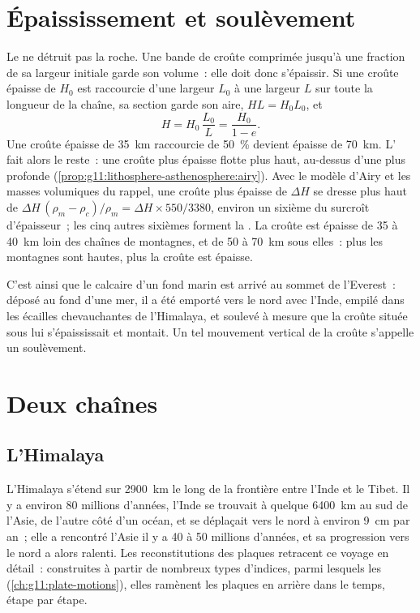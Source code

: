 \section{Épaississement et soulèvement}

Le  ne détruit pas la roche. Une bande de croûte comprimée
jusqu'à une fraction de sa largeur initiale garde son volume~: elle doit
donc s'épaissir. Si une croûte épaisse de $H_0$ est raccourcie d'une
largeur $L_0$ à une largeur $L$ sur toute la longueur de la chaîne, sa
section garde son aire, $H L = H_0 L_0$, et
\[
  H = H_0\,\frac{L_0}{L} = \frac{H_0}{1 - e}.
\]
Une croûte épaisse de \qty{35}{km} raccourcie de \qty{50}{\percent} devient
épaisse de \qty{70}{km}. L' fait alors le reste~: une croûte plus
épaisse flotte plus haut, au-dessus d'une  plus profonde
(\cref{prop:g11:lithosphere-asthenosphere:airy}). Avec le modèle d'Airy et
les masses volumiques du rappel, une croûte plus épaisse de $\Delta H$ se
dresse plus haut de $\Delta H\,(\rho_m - \rho_c)/\rho_m = \Delta H
\times 550/3380$, environ un sixième du surcroît d'épaisseur~; les cinq
autres sixièmes forment la . La croûte est épaisse de 35 à
\qty{40}{km} loin des chaînes de montagnes, et de 50 à \qty{70}{km} sous
elles~: plus les montagnes sont hautes, plus la croûte est épaisse.

C'est ainsi que le calcaire d'un fond marin est arrivé au sommet de
l'Everest~: déposé au fond d'une mer, il a été emporté vers le nord avec
l'Inde, empilé dans les écailles chevauchantes de l'Himalaya, et soulevé à
mesure que la croûte située sous lui s'épaississait et montait. Un tel
mouvement vertical de la croûte s'appelle un soulèvement.

\section{Deux chaînes}

\subsection{L'Himalaya}

L'Himalaya s'étend sur \qty{2900}{km} le long de la frontière entre l'Inde
et le Tibet. Il y a environ 80 millions d'années, l'Inde se trouvait à
quelque \qty{6400}{km} au sud de l'Asie, de l'autre côté d'un océan, et se
déplaçait vers le nord à environ \qty{9}{cm} par an~; elle a rencontré
l'Asie il y a 40 à 50 millions d'années, et sa progression vers le nord a
alors ralenti. Les reconstitutions des plaques retracent ce voyage en
détail~: construites à partir de nombreux types d'indices, parmi lesquels
les  (\cref{ch:g11:plate-motions}), elles ramènent
les plaques en arrière dans le temps, étape par étape.

